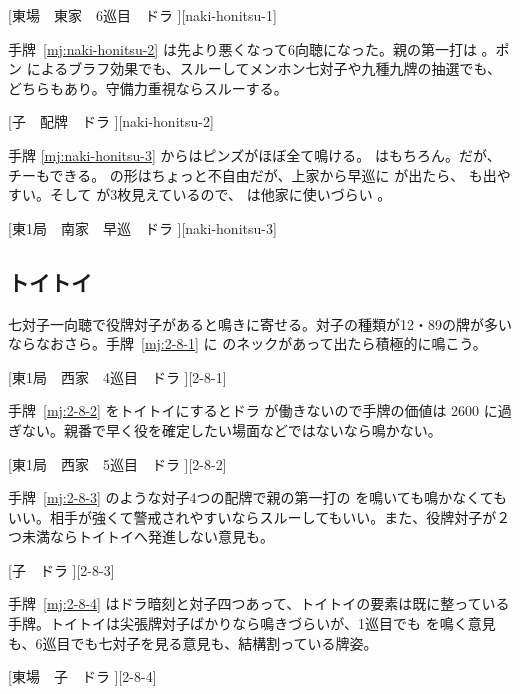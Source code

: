 \documentclass[../nankiru_main.tex]{subfiles}
\begin{document}
[東場　東家　6巡目　ドラ ][naki-honitsu-1]

手牌~\ref{mj:naki-honitsu-2} は先より悪くなって6向聴になった。親の第一打は 。ポン  によるブラフ効果でも、スルーしてメンホン七対子や九種九牌の抽選でも、どちらもあり\citep[][pp.~124--125, p.~217]{fkt}。守備力重視ならスルーする。

[子　配牌　ドラ ][naki-honitsu-2]

手牌 \ref{mj:naki-honitsu-3} からはピンズがほぼ全て鳴ける。 はもちろん。だが、  チーもできる。 の形はちょっと不自由だが、上家から早巡に  が出たら、 も出やすい。そして  が3枚見えているので、 は他家に使いづらい \citep[][pp.~121--123]{kawamura-naki}。

[東1局　南家　早巡　ドラ ][naki-honitsu-3]


\subsection{トイトイ}

七対子一向聴で役牌対子があると鳴きに寄せる。対子の種類が12・89の牌が多いならなおさら。手牌~\ref{mj:2-8-1} に  のネックがあって出たら積極的に鳴こう\citep[][pp.~204--211]{tetsusenryaku}。

[東1局　西家　4巡目　ドラ ][2-8-1]

手牌~\ref{mj:2-8-2} をトイトイにするとドラ  が働きないので手牌の価値は 2600 に過ぎない。親番で早く役を確定したい場面などではないなら鳴かない。

[東1局　西家　5巡目　ドラ ][2-8-2]

手牌~\ref{mj:2-8-3} のような対子4つの配牌で親の第一打の  を鳴いても鳴かなくてもいい。相手が強くて警戒されやすいならスルーしてもいい。また、役牌対子が２つ未満ならトイトイへ発進しない意見も\citep[][pp.~132--133, p~217]{fkt}。

[子　ドラ ][2-8-3]

手牌~\ref{mj:2-8-4} はドラ暗刻と対子四つあって、トイトイの要素は既に整っている手牌。トイトイは尖張牌対子ばかりなら鳴きづらいが、1巡目でも  を鳴く意見も、6巡目でも七対子を見る意見も、結構割っている牌姿\citep[][pp.~134--135, p.~217]{fkt}。

[東場　子　ドラ ][2-8-4]
\end{document}
